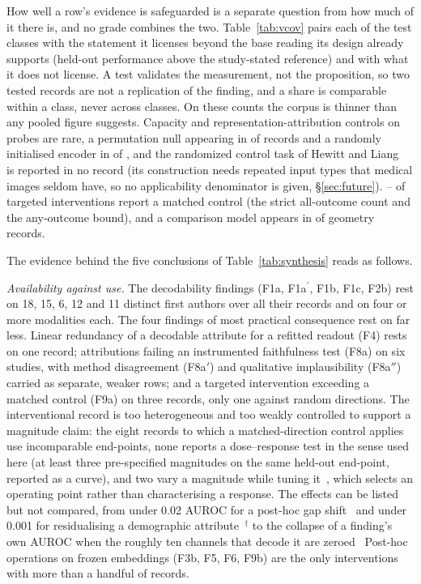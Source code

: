 How well a row's evidence is safeguarded is a separate question from how much of it there is, and no
grade combines the two. Table~\ref{tab:vcov} pairs each of the \Vnclasses{} test classes with the
statement it licenses beyond the base reading its design already supports (held-out performance above
the study-stated reference) and with what it does not license. A test validates the measurement, not the
proposition, so two tested records are not a replication of the finding, and a share is comparable within
a class, never across classes. On these counts the corpus is thinner than any pooled figure suggests.
Capacity and representation-attribution controls on probes are rare, a permutation null appearing in
\Vperm{} of \Vpermn{} records and a randomly initialised encoder in \Vlrn{} of \Vlrnn{}, and the
randomized control task of Hewitt and Liang~\cite{hewitt2019designing} is reported in no record (its
construction needs repeated input types that medical images seldom have, so no applicability denominator
is given, \S\ref{sec:future}). \Vspca{}--\Vspc{} of \Vspcn{} targeted interventions report a matched
control (the strict all-outcome count and the any-outcome bound), and a comparison model appears in
\Vcomp{} of \Vcompn{} geometry records.





The evidence behind the five conclusions of Table~\ref{tab:synthesis} reads as follows.

\emph{Availability against use.} The decodability findings (F1a, F1a$^{\prime}$, F1b, F1c, F2b) rest on
18, 15, 6, 12 and 11 distinct first authors over all their records and on four or more modalities each.
The four findings of most practical consequence rest on far less. Linear redundancy of a decodable
attribute for a refitted readout (F4) rests on one record; attributions failing an instrumented
faithfulness test (F8a) on six studies, with method disagreement (F8a$'$) and
qualitative implausibility (F8a$''$) carried as separate, weaker rows; and a targeted intervention
exceeding a matched control (F9a) on three records, only one against random directions. The
interventional record is too heterogeneous and too weakly controlled to support a magnitude claim: the
eight records to which a matched-direction control applies use incomparable end-points, none reports a
dose--response test in the sense used here (at least three pre-specified magnitudes on the same held-out
end-point, reported as a curve), and two vary a magnitude while tuning it~\cite{chen2026vihd,nooralahzadeh2026universal},
which selects an operating point rather than characterising a response. The effects can be listed but
not compared, from under 0.02 AUROC for a post-hoc gap shift~\cite{restrepo2026cone} and under 0.001 for
residualising a demographic attribute~\cite{kim2026encoding}$^{\dagger}$ to the collapse of a finding's
own AUROC when the roughly ten channels that decode it are zeroed~\cite{nooralahzadeh2026sparse}
Post-hoc operations on frozen embeddings (F3b, F5, F6,
F9b) are the only interventions with more than a handful of records.

